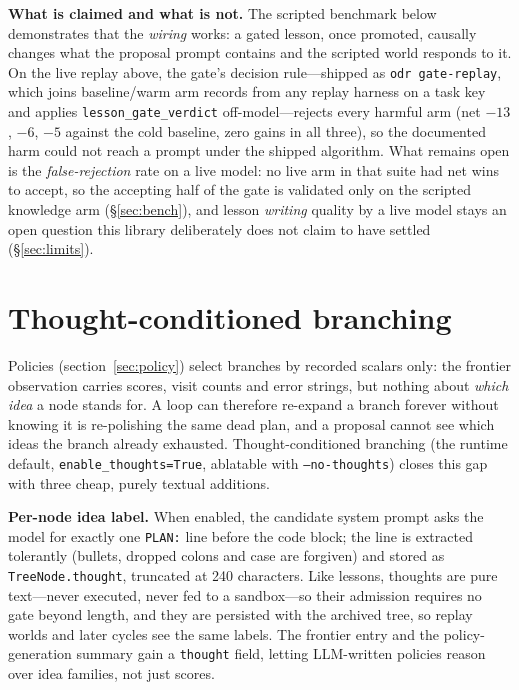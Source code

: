 \documentclass[11pt,a4paper]{article}
\newcommand{\hdr}[1]{\textbf{#1}}
\begin{document}
\hdr{What is claimed and what is not.} The scripted benchmark below
demonstrates that the \emph{wiring} works: a gated lesson, once promoted,
causally changes what the proposal prompt contains and the scripted world
responds to it. On the live replay above, the gate's decision rule---shipped
as \texttt{odr gate-replay}, which joins baseline/warm arm records from any
replay harness on a task key and applies \texttt{lesson\_gate\_verdict}
off-model---rejects every harmful arm (net $-13$,
$-6$, $-5$ against the cold baseline, zero gains in all three), so the
documented harm could not reach a prompt under the shipped algorithm. What
remains open is the \emph{false-rejection} rate on a live model: no live arm
in that suite had net wins to accept, so the accepting half of the gate is
validated only on the scripted knowledge arm
(\S\ref{sec:bench}), and lesson \emph{writing} quality by a live model stays
an open question this library deliberately does not claim to have settled
(\S\ref{sec:limits}).

\section{Thought-conditioned branching}
\label{sec:thoughts}

Policies (section~\ref{sec:policy}) select branches by recorded scalars only:
the frontier observation carries scores, visit counts and error strings, but
nothing about \emph{which idea} a node stands for. A loop can therefore
re-expand a branch forever without knowing it is re-polishing the same dead
plan, and a proposal cannot see which ideas the branch already exhausted.
Thought-conditioned branching (the runtime default,
\texttt{enable\_thoughts=True}, ablatable with \texttt{--no-thoughts}) closes
this gap with three cheap, purely textual additions.

\hdr{Per-node idea label.} When enabled, the candidate system prompt asks the
model for exactly one \texttt{PLAN:} line before the code block; the line is
extracted tolerantly (bullets, dropped colons and case are forgiven) and
stored as \texttt{TreeNode.thought}, truncated at 240 characters. Like
lessons, thoughts are pure text---never executed, never fed to a sandbox---so
their admission requires no gate beyond length, and they are persisted with
the archived tree, so replay worlds and later cycles see the same labels.
The frontier entry and the policy-generation summary gain a \texttt{thought}
field, letting LLM-written policies reason over idea families, not just scores.
\end{document}
